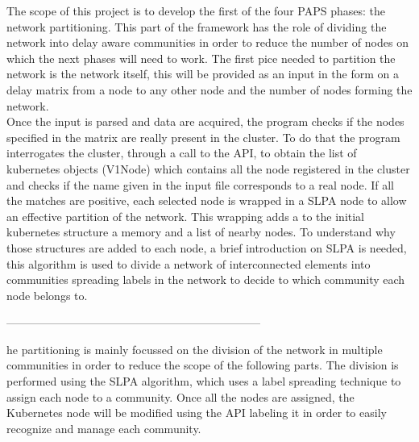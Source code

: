 The scope of this project is to develop the first of the four PAPS phases: the network 
partitioning. This part of the framework has the role of dividing the network into 
delay aware communities in order to reduce the number of nodes on which the next phases
will need to work. The first pice needed to partition the network is the network itself,
this will be provided as an input in the form on a delay matrix from a node to any other
node and the number of nodes forming the network. \\ 
Once the input is parsed and data are acquired, the program checks if the nodes specified 
in the matrix are really present in the cluster. To do that the program interrogates 
the cluster, through a call to the API, to obtain the list of kubernetes objects (V1Node)
which contains all the node registered in the cluster and checks if the name given in the
input file corresponds to a real node. If all the matches are positive, each selected 
node is wrapped in a SLPA \cite{SLPA} node to allow an effective partition of the network.
This wrapping adds a to the initial kubernetes structure a memory and a list of nearby 
nodes. To understand why those structures are added to each node, a brief introduction on
SLPA is needed, this algorithm is used to divide a network of interconnected elements into
communities spreading labels in the network to decide to which community each node belongs to.


--------------------------------------------------------------------

he partitioning is mainly focussed on the division of the network in multiple 
    communities in order to reduce the scope of the following parts. The division is performed using 
    the SLPA \cite{SLPA} algorithm, which uses a label spreading technique to assign each node to a
    community. Once all the nodes are assigned, the Kubernetes node will be modified using the API 
    labeling it in order to easily recognize and manage each community.